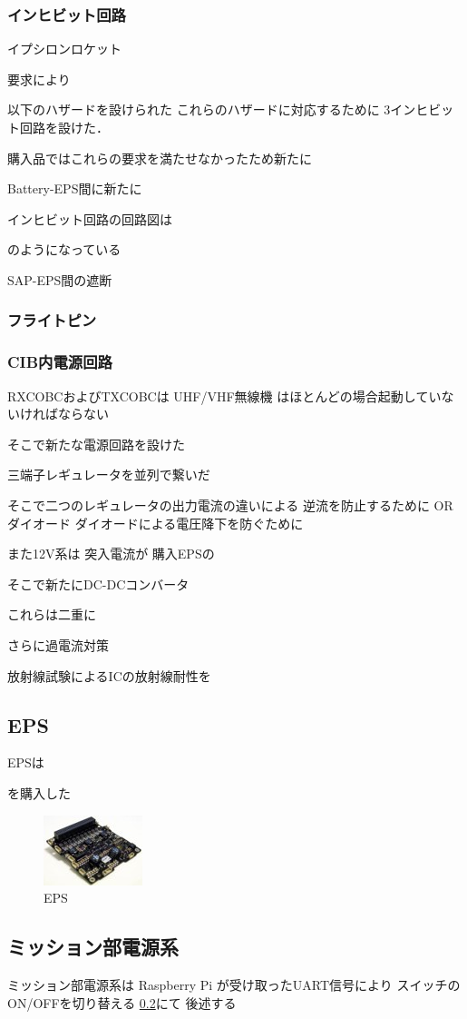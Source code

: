 \subsubsection{インヒビット回路}
イプシロンロケット


要求により

以下のハザードを設けられた
これらのハザードに対応するために
3インヒビット回路を設けた．

購入品ではこれらの要求を満たせなかったため新たに

Battery-EPS間に新たに

インヒビット回路の回路図は

のようになっている

SAP-EPS間の遮断


\subsubsection{フライトピン}

\subsubsection{CIB内電源回路}
RXCOBCおよびTXCOBCは
UHF/VHF無線機
はほとんどの場合起動していないければならない

そこで新たな電源回路を設けた

三端子レギュレータを並列で繋いだ

そこで二つのレギュレータの出力電流の違いによる
逆流を防止するために
ORダイオード
ダイオードによる電圧降下を防ぐために


また12V系は
突入電流が
購入EPSの

そこで新たにDC-DCコンバータ

これらは二重に

さらに過電流対策

放射線試験によるICの放射線耐性を




\subsection{EPS}
EPSは

を購入した
\begin{figure}[htbp]
	\begin{center}
		\includegraphics[width=0.5\linewidth]{./03/fig/eps.jpg}
		\caption{EPS}
		\label{eps}
	\end{center}
\end{figure}

\subsection{ミッション部電源系}
ミッション部電源系は
Raspberry Pi
が受け取ったUART信号により
スイッチのON/OFFを切り替える
\ref{}にて
後述する


